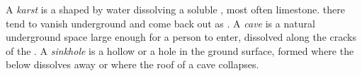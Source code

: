 \begin{definition}\label{def:g9:landforms:karst}
A \emph{karst} is a  shaped by water dissolving a
soluble , most often limestone.  there tend to vanish
underground and come back out as . A \emph{cave} is a
natural underground space large enough for a person to enter, dissolved
along the cracks of the . A \emph{sinkhole} is a hollow
or a hole in the ground surface, formed where the  below dissolves
away or where the roof of a cave collapses.
\end{definition}

